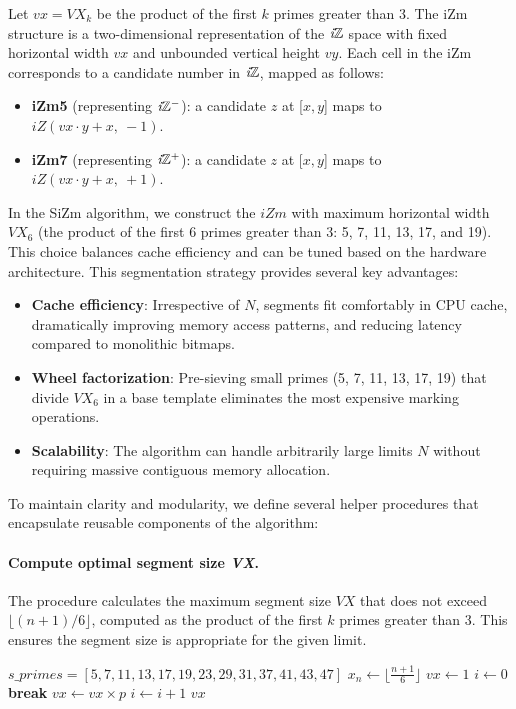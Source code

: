 \documentclass{article}
\begin{document}
Let $vx = VX_k$ be the product of the first $k$ primes greater than 3. The iZm structure is a two-dimensional representation of the $\textit{i}\mathbb{Z}$ space with fixed horizontal width $vx$ and unbounded vertical height $vy$. Each cell in the iZm corresponds to a candidate number in $\textit{i}\mathbb{Z}$, mapped as follows:
\begin{itemize}
    \item \textbf{iZm5} (representing $\textit{i}\mathbb{Z}^-$): \quad a candidate $z$ at [$x, y$] maps to $iZ(vx\cdot y + x,\ -1)$.
    \item \textbf{iZm7} (representing $\textit{i}\mathbb{Z}^+$): \quad a candidate $z$ at [$x, y$] maps to $iZ(vx\cdot y + x,\ +1)$.
\end{itemize}
In the SiZm algorithm, we construct the $iZm$ with maximum horizontal width $VX_6$ (the product of the first 6 primes greater than 3: 5, 7, 11, 13, 17, and 19). This choice balances cache efficiency and can be tuned based on the hardware architecture. 
This segmentation strategy provides several key advantages:
\begin{itemize}[noitemsep]
    \item \textbf{Cache efficiency}: Irrespective of $N$, segments fit comfortably in CPU cache, dramatically improving memory access patterns, and reducing latency compared to monolithic bitmaps.
    \item \textbf{Wheel factorization}: Pre-sieving small primes (5, 7, 11, 13, 17, 19) that divide $VX_6$ in a base template eliminates the most expensive marking operations.
    \item \textbf{Scalability}: The algorithm can handle arbitrarily large limits $N$ without requiring massive contiguous memory allocation.
\end{itemize}

To maintain clarity and modularity, we define several helper procedures that encapsulate reusable components of the algorithm:

\paragraph{Compute optimal segment size \emph{VX}.}

The  procedure calculates the maximum segment size $VX$ that does not exceed $\lfloor (n + 1) / 6 \rfloor$, computed as the product of the first $k$ primes greater than 3. This ensures the segment size is appropriate for the given limit.

\begin{algorithmic}[1]
    \State {} $s\_primes = [5, 7, 11, 13, 17, 19, 23, 29, 31, 37, 41, 43, 47]$ 
        \State $x_n \gets \lfloor\frac{n + 1}{6}\rfloor$
        \State $vx \gets 1$
        \State $i \gets 0$
         
             \textbf{break} 
            \EndIf
            \State $vx \gets vx \times p$
            \State $i \gets i + 1$
        \EndFor
        \State \Return $vx$
    \EndProcedure
\end{algorithmic}
\end{document}
